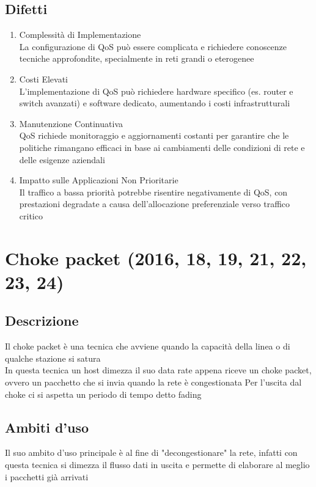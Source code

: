\documentclass[10pt,oneside,a4paper]{article}
\begin{document}
\subsection{Difetti}
\begin{enumerate}
\item Complessità di Implementazione\\
La configurazione di QoS può essere complicata e richiedere conoscenze tecniche approfondite, specialmente in reti grandi o eterogenee
\item Costi Elevati\\
L'implementazione di QoS può richiedere hardware specifico (es. router e switch avanzati) e software dedicato, aumentando i costi infrastrutturali
\item Manutenzione Continuativa\\
QoS richiede monitoraggio e aggiornamenti costanti per garantire che le politiche rimangano efficaci in base ai cambiamenti delle condizioni di rete e delle esigenze aziendali
\item Impatto sulle Applicazioni Non Prioritarie\\
Il traffico a bassa priorità potrebbe risentire negativamente di QoS, con prestazioni degradate a causa dell'allocazione preferenziale verso traffico critico
\end{enumerate}
\section{Choke packet (2016, 18, 19, 21, 22, 23, 24)}
\subsection{Descrizione}
Il choke packet è una tecnica che avviene quando la capacità della linea o di qualche stazione si satura\\
In questa tecnica un host dimezza il suo data rate appena riceve un choke packet, ovvero un pacchetto che si invia quando la rete è congestionata
Per l'uscita dal choke ci si aspetta un periodo di tempo detto fading
\subsection{Ambiti d'uso}
Il suo ambito d'uso principale è al fine di "decongestionare" la rete, infatti con questa tecnica si dimezza il flusso dati in uscita e permette di elaborare al meglio i pacchetti già arrivati
\end{document}
